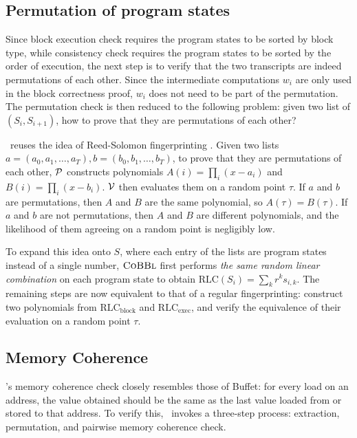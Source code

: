 \subsection{Permutation of program states} \label{sec:perm}
Since block execution check requires the program states to be sorted by block type, while consistency check requires the program states to be sorted by the order of execution, the next step is to verify that the two transcripts are indeed permutations of each other. Since the intermediate computations $w_i$ are only used in the block correctness proof, $w_i$ does not need to be part of the permutation. The permutation check is then reduced to the following problem: given two list of $(S_i, S_{i+1})$, how to prove that they are permutations of each other?

\CoBBl~reuses the idea of Reed-Solomon fingerprinting \cite{lipton90efficient}. Given two lists $a = (a_0, a_1, \dots, a_T), b = (b_0, b_1, \dots, b_T)$, to prove that they are permutations of each other, $\P$ constructs polynomials $A(i) = \prod_i(x - a_i)$ and $B(i) = \prod_i(x - b_i)$. $\V$ then evaluates them on a random point $\tau$. If $a$ and $b$ are permutations, then $A$ and $B$ are the same polynomial, so $A(\tau) = B(\tau)$. If $a$ and $b$ are not permutations, then $A$ and $B$ are different polynomials, and the likelihood of them agreeing on a random point is negligibly low.

To expand this idea onto $S$, where each entry of the lists are program states instead of a single number, $\CoBBl$ first performs \emph{the same random linear combination} on each program state to obtain $\text{RLC}(S_i) = \sum_k r^k s_{i, k}$. The remaining steps are now equivalent to that of a regular fingerprinting: construct two polynomials from $\text{RLC}_{\text{block}}$ and $\text{RLC}_{\text{exec}}$, and verify the equivalence of their evaluation on a random point $\tau$.

\subsection{Memory Coherence}
\CoBBl's memory coherence check closely resembles those of Buffet: for every load on an address, the value obtained should be the same as the last value loaded from or stored to that address. To verify this, \CoBBl~invokes a three-step process: extraction, permutation, and pairwise memory coherence check.

